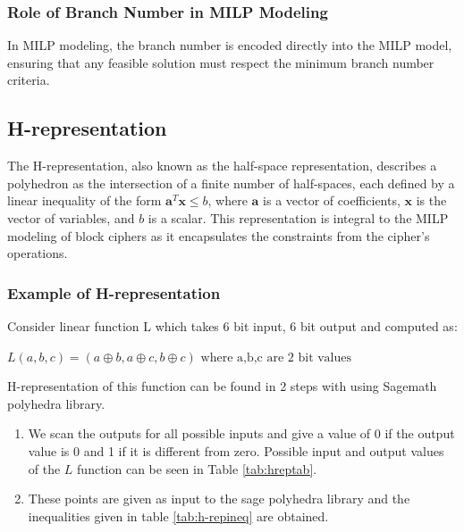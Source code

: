 \newpage
\subsubsection{Role of Branch Number in MILP Modeling}

In MILP modeling, the branch number is encoded directly into the MILP model, ensuring that any feasible solution must respect the minimum branch number criteria. 

\subsection{H-representation}

The H-representation, also known as the half-space representation, describes a polyhedron as the intersection of a finite number of half-spaces, each defined by a linear inequality of the form $ \mathbf{a}^T \mathbf{x} \leq b $, where $\mathbf{a} $ is a vector of coefficients, $ \mathbf{x} $ is the vector of variables, and $ b $ is a scalar. This representation is integral to the MILP modeling of block ciphers as it encapsulates the constraints from the cipher's operations.

\subsubsection{Example of H-representation}

Consider linear function L which takes 6 bit input, 6 bit output and computed as:
\begin{center}
    $L(a,b,c)=(a \oplus b , a \oplus c , b \oplus c ) \text{ where a,b,c are 2 bit values}  $
\end{center}


H-representation of this function can be found in 2 steps with using  Sagemath polyhedra library. \cite{sage}

\begin{enumerate}
    \item We scan the outputs for all possible inputs and give a value of 0 if the output value is 0 and 1 if it is different from zero. Possible input and output values of the $L$ function can be seen in Table \ref{tab:hreptab}.

    \item These points are given as input to the sage polyhedra library and the inequalities given in table \ref{tab:h-repineq} are obtained.
    
\end{enumerate}

